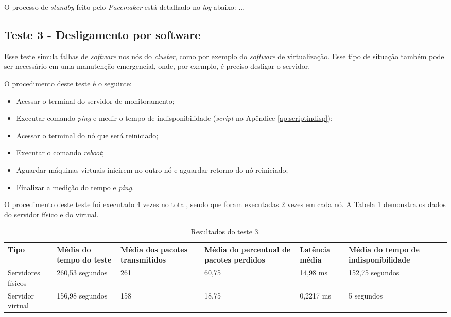 O processo de \textit{standby} feito pelo \textit{Pacemaker} está detalhado no \textit{log} abaixo:
...

\subsection{Teste 3 - Desligamento por software}

Esse teste simula falhas de \textit{software} nos nós do \textit{cluster}, como por exemplo do \textit{software} de virtualização. Esse tipo de 
situação também pode ser necessário em uma manutenção emergencial, onde, por exemplo, é preciso desligar o servidor.

O procedimento deste teste é o seguinte:
\begin{itemize}
 \item Acessar o terminal do servidor de monitoramento;
 \item Executar comando \textit{ping} e medir o tempo de indisponibilidade (\textit{script} no Apêndice \ref{ap:scriptindisp});
 \item Acessar o terminal do nó que será reiniciado;
 \item Executar o comando \textit{reboot};
 \item Aguardar máquinas virtuais inicirem no outro nó e aguardar retorno do nó reiniciado;
 \item Finalizar a medição do tempo e \textit{ping}.
\end{itemize}

O procedimento deste teste foi executado 4 vezes no total, sendo que foram executadas 2 vezes em cada nó. A Tabela \ref{tab:teste3resultados}
demonstra os dados do servidor físico e do virtual.

\begin{table}[h!]
\caption{Resultados do teste 3.}
\label{tab:teste3resultados}
\begin{center}
\begin{tabular}{|l|p{2.5cm}|p{2.5cm}|p{2.5cm}|p{2.5cm}|p{3cm}|}\hline
\textbf{Tipo} & \textbf{Média do tempo do teste} & \textbf{Média dos pacotes transmitidos} & \textbf{Média do percentual de pacotes perdidos} & \textbf{Latência média} & \textbf{Média do tempo de indisponibilidade} \\\hline
Servidores físicos & 260,53 segundos & 261 & 60,75 & 14,98 ms & 152,75 segundos \\\hline
Servidor virtual & 156,98 segundos & 158 & 18,75 & 0,2217 ms & 5 segundos \\\hline
\end{tabular}
\end{center}
\end{table}

